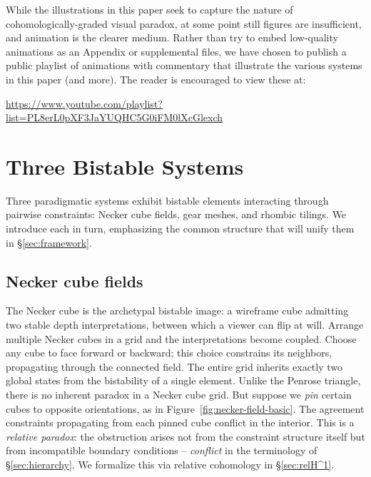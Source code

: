 \documentclass[11pt]{amsart}  %
\theoremstyle{plain}
\theoremstyle{definition}
\theoremstyle{remark}
\newcommand{\style}[1]{{\em #1}} %
\begin{document}
While the illustrations in this paper seek to capture the nature of cohomologically-graded visual paradox, at some point still figures are insufficient, and animation is the clearer medium. Rather than try to embed low-quality animations as an Appendix or supplemental files, we have chosen to publish a public playlist of animations with commentary that illustrate the various systems in this paper (and more). The reader is encouraged to view these at: 

\begin{center}    
\protect\url{https://www.youtube.com/playlist?list=PL8erL0pXF3JaYUQHC5G0iFM0lXcGlexch}
\end{center}

\section{Three Bistable Systems}
\label{sec:three-systems}

Three paradigmatic systems exhibit bistable elements interacting through pairwise constraints: Necker cube fields, gear meshes, and rhombic tilings. We introduce each in turn, emphasizing the common structure that will unify them in \S\ref{sec:framework}.

\subsection{Necker cube fields}
\label{sec:necker}

The Necker cube is the archetypal bistable image: a wireframe cube admitting two stable depth interpretations, between which a viewer can flip at will.
Arrange multiple Necker cubes in a grid and the interpretations become coupled. Choose any cube to face forward or backward; this choice constrains its neighbors, propagating through the connected field. The entire grid inherits exactly two global states from the bistability of a single element.
Unlike the Penrose triangle, there is no inherent paradox in a Necker cube grid. But suppose we \emph{pin} certain cubes to opposite orientations, as in Figure~\ref{fig:necker-field-basic}. The agreement constraints propagating from each pinned cube conflict in the interior. This is a \style{relative paradox}: the obstruction arises not from the constraint structure itself but from incompatible boundary conditions -- \style{conflict} in the terminology of \S\ref{sec:hierarchy}. We formalize this via relative cohomology in \S\ref{sec:relH^1}.
\end{document}
